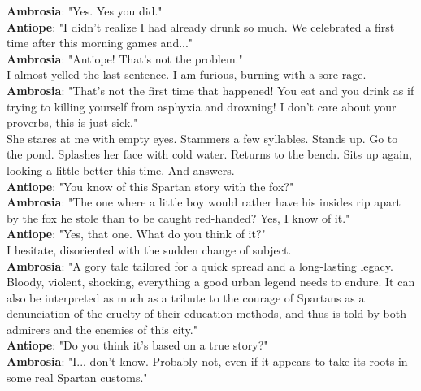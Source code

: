 \documentclass{report}
\newcommand{\speaker}[1]{
	\textbf{#1}: 
}
\begin{document}
\speaker{Ambrosia} "Yes. Yes you did."\\

\speaker{Antiope} "I didn't realize I had already drunk so much. We celebrated a first time after this morning games and..."\\

\speaker{Ambrosia} "Antiope! That's not the problem."\\

I almost yelled the last sentence. I am furious, burning with a sore rage.\\

\speaker{Ambrosia} "That's not the first time that happened! You eat and you drink as if trying to killing yourself from asphyxia and drowning! I don't care about your proverbs, this is just sick."\\

She stares at me with empty eyes. Stammers a few syllables. Stands up. Go to the pond. Splashes her face with cold water. Returns to the bench. Sits up again, looking a little better this time. And answers.\\

\speaker{Antiope} "You know of this Spartan story with the fox?"\\

\speaker{Ambrosia} "The one where a little boy would rather have his insides rip apart by the fox he stole than to be caught red-handed? Yes, I know of it."\\

\speaker{Antiope} "Yes, that one. What do you think of it?"\\

I hesitate, disoriented with the sudden change of subject.\\

\speaker{Ambrosia} "A gory tale tailored for a quick spread and a long-lasting legacy. Bloody, violent, shocking, everything a good urban legend needs to endure. It can also be interpreted as much as a tribute to the courage of Spartans as a denunciation of the cruelty of their education methods, and thus is told by both admirers and the enemies of this city."\\

\speaker{Antiope} "Do you think it's based on a true story?"\\

\speaker{Ambrosia} "I... don't know. Probably not, even if it appears to take its roots in some real Spartan customs."\\
\end{document}

